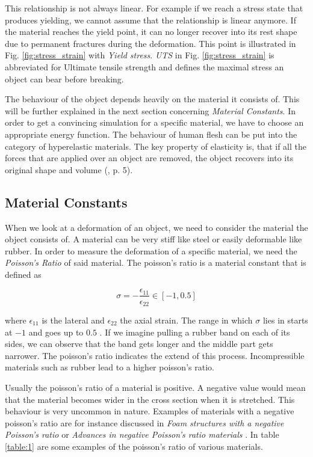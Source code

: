 This relationship is not always linear. For example if we reach a stress state that produces yielding, we cannot assume that the relationship is linear anymore. If the material reaches the yield point, it can no longer recover into its rest shape due to permanent fractures during the deformation. This point is illustrated in Fig. \ref{fig:stress_strain} with \textit{Yield stress}. \textit{UTS} in Fig. \ref{fig:stress_strain} is abbreviated for Ultimate tensile strength and defines the maximal stress an object can bear before breaking. 

The behaviour of the object depends heavily on the material it consists of. This will be further explained in the next section concerning \textit{Material Constants}. In order to get a convincing simulation for a specific material, we have to choose an appropriate energy function. The behaviour of human flesh can be put into the category of hyperelastic materials. The key property of elasticity is, that if all the forces that are applied over an object are removed, the object recovers into its original shape and volume (\cite{KORSUNSKY20175}, p. 5).


\subsection{Material Constants}
When we look at a deformation of an object, we need to consider the material the object consists of. A material can be very stiff like steel or easily deformable like rubber. In order to measure the deformation of a specific material, we need the \textit{Poisson's Ratio} of said material. The poisson's ratio is a material constant that is defined as 

\begin{equation}\label{eq:poisson}
\sigma = - \frac{\epsilon_{11}}{\epsilon_{22}} \in [-1, 0.5]
\end{equation}

where $\epsilon_{11}$ is the lateral and $\epsilon_{22}$ the axial strain. The range in which $\sigma$ lies in starts at $-1$ and goes up to $0.5$ \cite{PhysRevB.80.132104}. If we imagine pulling a rubber band on each of its sides, we can observe that the band gets longer and the middle part gets narrower. The poisson's ratio indicates the extend of this process. Incompressible materials such as rubber lead to a higher poisson's ratio.

Usually the poisson's ratio of a material is positive. A negative value would mean that the material becomes wider in the cross section when it is stretched. This behaviour is very uncommon in nature. Examples of materials with a negative poisson's ratio are for instance discussed in \textit{Foam structures with a negative Poisson's ratio} \cite{lakes1987foam} or \textit{Advances in negative Poisson's ratio materials} \cite{lakes1993advances}. In table \ref{table:1} are some examples of the poisson's ratio of various materials.

